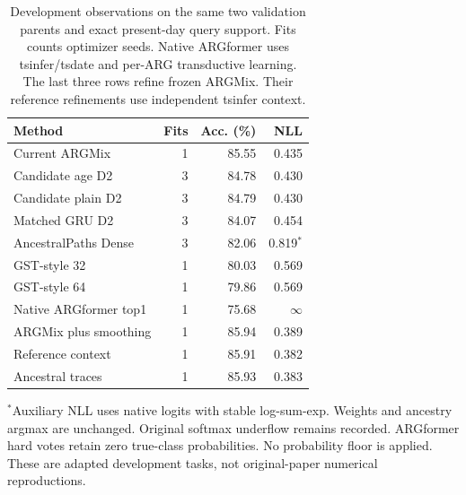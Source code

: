 \begin{table}[t]
\centering
\caption{Development observations on the same two validation parents and exact present-day query support. Fits counts optimizer seeds. Native ARGformer uses tsinfer/tsdate and per-ARG transductive learning. The last three rows refine frozen ARGMix. Their reference refinements use independent tsinfer context.}
\label{tab:biological-development}
\begin{tabular}{lrrr}
\toprule
Method & Fits & Acc. (\%) & NLL \\
\midrule
Current ARGMix & 1 & 85.55 & 0.435 \\
Candidate age D2 & 3 & 84.78 & 0.430 \\
Candidate plain D2 & 3 & 84.79 & 0.430 \\
Matched GRU D2 & 3 & 84.07 & 0.454 \\
AncestralPaths Dense & 3 & 82.06 & 0.819$^{*}$ \\
GST-style 32 & 1 & 80.03 & 0.569 \\
GST-style 64 & 1 & 79.86 & 0.569 \\
Native ARGformer top1 & 1 & 75.68 & $\infty$ \\
ARGMix plus smoothing & 1 & 85.94 & 0.389 \\
Reference context & 1 & 85.91 & 0.382 \\
Ancestral traces & 1 & 85.93 & 0.383 \\
\bottomrule
\end{tabular}
\par\smallskip
\parbox{\columnwidth}{\footnotesize $^{*}$Auxiliary NLL uses native logits with stable log-sum-exp. Weights and ancestry argmax are unchanged. Original softmax underflow remains recorded. ARGformer hard votes retain zero true-class probabilities. No probability floor is applied. These are adapted development tasks, not original-paper numerical reproductions.}
\end{table}
